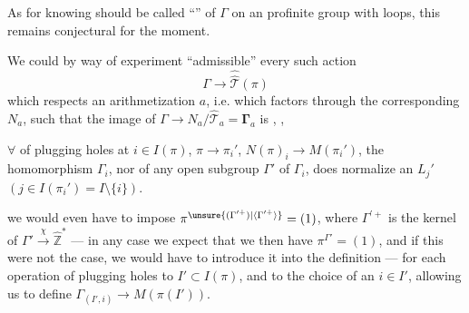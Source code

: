 As for knowing  should be
called   ``'' of
$\Gamma$ on an  \unsure{(}profinite\unsure{)|,} group with loops,
this remains conjectural for the moment.

We could by way of experiment
 
``admissible'' every such action
\[
 \Gamma\longrightarrow\widehat{\widehat{\mathcal T}}(\pi)
\]
which respects an arithmetization $a$,
i.e. which factors through the corresponding $N_a$,  such that the image of
$\Gamma\longrightarrow N_a/\widehat{\mathcal T}_a=\boldsymbol{\Gamma}_a$
is ,
, 

$\forall$  of plugging holes at $i\in I(\pi)$,
$\pi\longrightarrow\pi_i'$, $N(\pi)_i\longrightarrow M(\pi_i')$, the  homomorphism
$\Gamma_i$, nor of any open subgroup $\Gamma'$
of $\Gamma_i$, does  normalize an $L_j'$ $(j\in I(\pi_i')=I\setminus\{i\})$.


 we would even have to impose
$\pi^{\unsure{(\Gamma^{\prime+})|\langle\Gamma^{\prime+}\rangle}}=(1)$, where $\Gamma^{\prime+}$ is the kernel of
$\Gamma'\xrightarrow{\chi}\widehat{\mathbb Z}^{*}$ --- in any case we expect
\unsure{---} that we then have $\pi^{\Gamma'}=(1)$,
and if this were not the case, we would have to
introduce it into the definition --- for
each operation of plugging holes
 to $I'\subset I(\pi)$, and to the choice of an
$i\in I'$, allowing us to define $\Gamma_{(I',i)}\longrightarrow M(\pi(I'))$.

